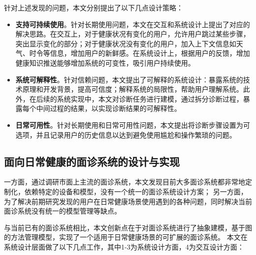 针对上述发现的问题，本文分别提出了以下几点设计策略：
\begin{itemize}
    \item \textbf{支持可持续使用}。针对长期使用问题，本文在交互和系统设计上提出了对应的解决思路。在交互上，对于健康状况有变化的用户，允许用户跳过某些步骤，突出显示变化的部分；对于健康状况没有变化的用户，加入上下文信息如天气、时令等信息，增加用户的新鲜感。在系统设计上，根据用户的反馈，增加健康知识推送能够增加系统的可变性，吸引用户持续使用。
    \item \textbf{系统可解释性}。针对信赖问题，本文提出了可解释的系统设计：暴露系统的技术原理和开发背景，提高可信度；解释系统的局限性，帮助用户理解系统。此外，在后续的系统实现中，本文对诊断任务进行建模，通过拆分诊断过程，暴露每个中间过程的结果，以实现诊断结果的可解释性。
    \item \textbf{日常可用性}。针对长期使用和日常可用性问题，本文提出将诊断步骤设置为可选项，并且记录用户的历史信息以达到避免使用尴尬和操作繁琐的问题。
\end{itemize}


\subsection{面向日常健康的面诊系统的设计与实现}
一方面，通过调研市面上主流的面诊系统，本文发现目前大多面诊系统都非常地定制化，依赖特定的设备和模型，没有一个统一的面诊系统设计方案；
另一方面，为了解决前期研究发现的用户在日常健康场景使用遇到的各种问题，同时解决当前面诊系统没有统一的模型管理等缺点。

与当前已有的面诊系统相比，本文创新点在于对面诊系统进行了抽象建模，基于图的方法管理模型，实现了一个适用于日常健康场景的可扩展的面诊系统。
本文在系统设计层面做了以下几点工作，其中1-3为系统设计方面，4为交互设计方面：

